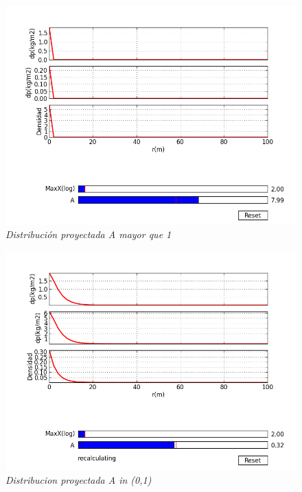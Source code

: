 \documentclass[12pt]{book}
\begin{document}
\begin{figure}[!h]
 \centering
 \includegraphics[scale=0.7]{dp2.png}
 \caption{\emph{Distribución proyectada A mayor que 1}}
 \label{Fig: 1}
\end{figure}

\begin{figure}[!h]
 \centering
 \includegraphics[scale=0.7]{dp3.png}
 \caption{\emph{Distribucion proyectada A in (0,1) }}
 \label{Fig: 1}
\end{figure}
\end{document}

